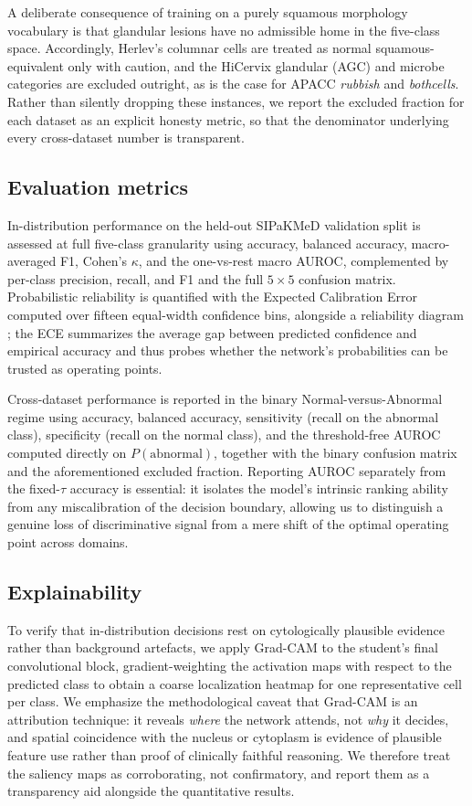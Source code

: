 A deliberate consequence of training on a purely squamous morphology vocabulary is that glandular lesions have no admissible home in the five-class space. Accordingly, Herlev's columnar cells are treated as normal squamous-equivalent only with caution, and the HiCervix glandular (AGC) and microbe categories are excluded outright, as is the case for APACC \emph{rubbish} and \emph{bothcells}. Rather than silently dropping these instances, we report the excluded fraction for each dataset as an explicit honesty metric, so that the denominator underlying every cross-dataset number is transparent.

\subsection{Evaluation metrics}

In-distribution performance on the held-out SIPaKMeD validation split is assessed at full five-class granularity using accuracy, balanced accuracy, macro-averaged F1, Cohen's $\kappa$, and the one-vs-rest macro AUROC, complemented by per-class precision, recall, and F1 and the full $5\times5$ confusion matrix. Probabilistic reliability is quantified with the Expected Calibration Error computed over fifteen equal-width confidence bins, alongside a reliability diagram \citep{guo2017calibration}; the ECE summarizes the average gap between predicted confidence and empirical accuracy and thus probes whether the network's probabilities can be trusted as operating points.

Cross-dataset performance is reported in the binary Normal-versus-Abnormal regime using accuracy, balanced accuracy, sensitivity (recall on the abnormal class), specificity (recall on the normal class), and the threshold-free AUROC computed directly on $P(\text{abnormal})$, together with the binary confusion matrix and the aforementioned excluded fraction. Reporting AUROC separately from the fixed-$\tau$ accuracy is essential: it isolates the model's intrinsic ranking ability from any miscalibration of the decision boundary, allowing us to distinguish a genuine loss of discriminative signal from a mere shift of the optimal operating point across domains.

\subsection{Explainability}

To verify that in-distribution decisions rest on cytologically plausible evidence rather than background artefacts, we apply Grad-CAM \citep{selvaraju2017gradcam} to the student's final convolutional block, gradient-weighting the activation maps with respect to the predicted class to obtain a coarse localization heatmap for one representative cell per class. We emphasize the methodological caveat that Grad-CAM is an attribution technique: it reveals \emph{where} the network attends, not \emph{why} it decides, and spatial coincidence with the nucleus or cytoplasm is evidence of plausible feature use rather than proof of clinically faithful reasoning. We therefore treat the saliency maps as corroborating, not confirmatory, and report them as a transparency aid alongside the quantitative results.